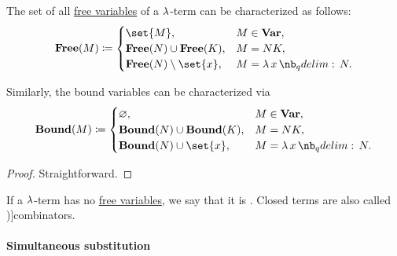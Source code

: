 \begin{proposition}\label{thm:lambda_variable_freeness_characterization}
  The set of all \hyperref[def:lambda_variable_freeness]{free variables} of a \( \mathrm{\lambda} \)-term can be characterized as follows:
  \begin{equation*}
    \op*{Free}(M) \coloneqq \begin{cases}
      \set{ M },                         &M \in \op*{Var}, \\
      \op*{Free}(N) \cup \op*{Free}(K),  &M = N K, \\
      \op*{Free}(N) \setminus \set{ x }, &M = \qabs x N. \\
    \end{cases}
  \end{equation*}

  Similarly, the bound variables can be characterized via
  \begin{equation*}
    \op*{Bound}(M) \coloneqq \begin{cases}
      \varnothing,                        &M \in \op*{Var}, \\
      \op*{Bound}(N) \cup \op*{Bound}(K), &M = N K, \\
      \op*{Bound}(N) \cup \set{ x },      &M = \qabs x N. \\
    \end{cases}
  \end{equation*}
\end{proposition}
\begin{proof}
  Straightforward.
\end{proof}

\begin{definition}\label{def:lambda_combinator}
  If a \( \mathrm{\lambda} \)-term has no \hyperref[def:lambda_variable_freeness]{free variables}, we say that it is . Closed terms are also called \term[ru=комбинаторы (\cite[188]{Герасимов2011})]{combinators}.
\end{definition}

\paragraph{Simultaneous substitution}


